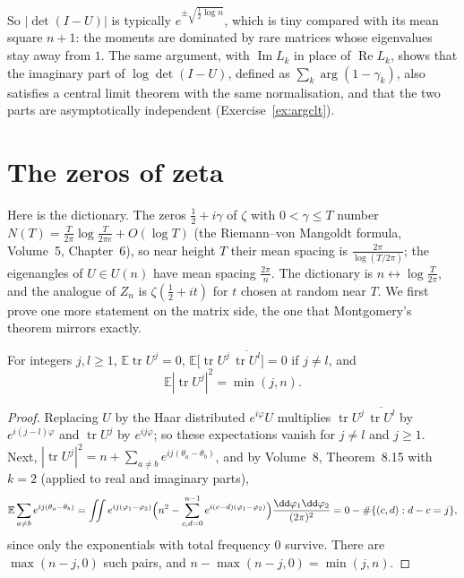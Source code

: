 So $|\det(I-U)|$ is typically $e^{\pm\sqrt{\frac12\log n}}$, which is tiny compared with its mean square $n+1$: the moments are dominated by rare matrices whose eigenvalues stay away from $1$. The same argument, with
$\operatorname{Im}L_k$ in place of $\operatorname{Re}L_k$, shows that the imaginary part of $\log\det(I-U)$, defined as $\sum_k\arg(1-\gamma_k)$, also satisfies a central limit theorem with the same normalisation, and that the
two parts are asymptotically independent (Exercise~\ref{ex:argclt}).

\section{The zeros of zeta}

Here is the dictionary. The zeros $\frac12+i\gamma$ of $\zeta$ with $0<\gamma\le T$ number $N(T)=\frac T{2\pi}\log\frac T{2\pi e}+O(\log T)$ (the Riemann--von Mangoldt formula, Volume~5, Chapter~6), so near height $T$ their mean spacing is
$\frac{2\pi}{\log(T/2\pi)}$; the eigenangles of $U\in U(n)$ have mean spacing $\frac{2\pi}n$. The dictionary is $n\leftrightarrow\log\frac T{2\pi}$, and the analogue of $Z_n$ is $\zeta(\frac12+it)$ for $t$ chosen at random near $T$. We first prove one
more statement on the matrix side, the one that Montgomery's theorem mirrors exactly.

\begin{proposition}\label{prop:formfactor}
For integers $j,l\ge1$, $\mathbb E\operatorname{tr}U^j=0$, $\mathbb E\bigl[\operatorname{tr}U^j\,\overline{\operatorname{tr}U^l}\bigr]=0$ if $j\ne l$, and
\[
\mathbb E|\operatorname{tr}U^j|^2=\min(j,n).
\]
\end{proposition}

\begin{proof}
Replacing $U$ by the Haar distributed $e^{i\varphi}U$ multiplies $\operatorname{tr}U^j\,\overline{\operatorname{tr}U^l}$ by $e^{i(j-l)\varphi}$ and $\operatorname{tr}U^j$ by $e^{ij\varphi}$; so these expectations vanish for $j\ne l$ and $j\ge1$. Next,
$|\operatorname{tr}U^j|^2=n+\sum_{a\ne b}e^{ij(\theta_a-\theta_b)}$, and by Volume~8, Theorem~8.15 with $k=2$ (applied to real and imaginary parts),
\[
\mathbb E\sum_{a\ne b}e^{ij(\theta_a-\theta_b)}=\iint e^{ij(\varphi_1-\varphi_2)}\Bigl(n^2-\sum_{c,d=0}^{n-1}e^{i(c-d)(\varphi_1-\varphi_2)}\Bigr)\frac{\dd\varphi_1\dd\varphi_2}{(2\pi)^2}=0-\#\{(c,d):d-c=j\},
\]
since only the exponentials with total frequency $0$ survive. There are $\max(n-j,0)$ such pairs, and $n-\max(n-j,0)=\min(j,n)$.
\end{proof}

